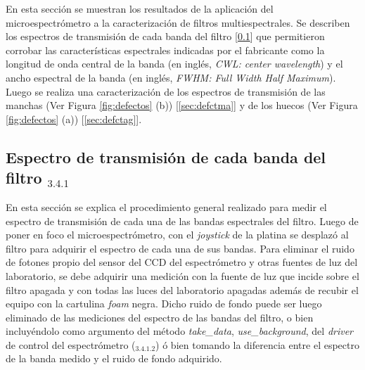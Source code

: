 \hspace{0.5cm} En esta sección se muestran los resultados de la aplicación del microespectrómetro a la caracterización de filtros multiespectrales. Se describen los espectros de transmisión de cada banda del filtro [\ref{sec:espectransm}] que permitieron corrobar las características espectrales indicadas por el fabricante como la longitud de onda central de la banda (en inglés, \textit{CWL: center wavelength}) y el ancho espectral de la banda (en inglés, \textit{FWHM: Full Width Half Maximum}). Luego se realiza una caracterización de los espectros de transmisión de las manchas (Ver Figura \ref{fig:defectos} (b)) [\ref{sec:defctma}] y de los huecos (Ver Figura \ref{fig:defectos} (a)) [\ref{sec:defctag}].


\singlespacing
\subsection{Espectro de transmisión de cada banda del filtro \href{https://github.com/jrr1984/open_frame_XYStage/blob/master/plot_spectrum_bands/plot_spectrum_bands.py}{\faGithub$_{3.4.1}$}}
\label{sec:espectransm}

\hspace{0.5cm}En esta sección se explica el procedimiento general realizado para medir el espectro de transmisión de cada una de las bandas espectrales del filtro. Luego de poner en foco el microespectrómetro, con el \textit{joystick} de la platina se desplazó al filtro para adquirir el espectro de cada una de sus bandas. Para eliminar el ruido de fotones propio del sensor del CCD del espectrómetro y otras fuentes de luz del laboratorio, se debe adquirir una medición con la fuente de luz que incide sobre el filtro apagada y con todas las luces del laboratorio apagadas además de recubir el equipo con la cartulina \textit{foam} negra. Dicho ruido de fondo puede ser luego eliminado de las mediciones del espectro de las bandas del filtro, o bien incluyéndolo como argumento del método \textit{take\_data}, \textit{use\_background}, del \textit{driver} de control del espectrómetro (\href{https://github.com/jrr1984/open\_frame\_XYStage/blob/master/XYStageAndSpec.py}{\faGithub$_{3.4.1.2}$}) ó bien tomando la diferencia entre el espectro de la banda medido y el ruido de fondo adquirido.

